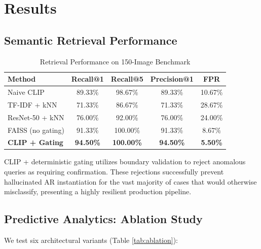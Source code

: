 \documentclass[conference]{IEEEtran}
\begin{document}
\section{Results}

\subsection{Semantic Retrieval Performance}

\begin{table}[h]
\centering
\caption{Retrieval Performance on 150-Image Benchmark}
\label{tab:retrieval_results}
\begin{tabular}{lcccc}
\toprule
\textbf{Method} & \textbf{Recall@1} & \textbf{Recall@5} & \textbf{Precision@1} & \textbf{FPR} \\
\midrule
Naive CLIP & 89.33\% & 98.67\% & 89.33\% & 10.67\% \\
TF-IDF + kNN & 71.33\% & 86.67\% & 71.33\% & 28.67\% \\
ResNet-50 + kNN & 76.00\% & 92.00\% & 76.00\% & 24.00\% \\
FAISS (no gating) & 91.33\% & 100.00\% & 91.33\% & 8.67\% \\
\textbf{CLIP + Gating} & \textbf{94.50\%} & \textbf{100.00\%} & \textbf{94.50\%} & \textbf{5.50\%} \\
\bottomrule
\end{tabular}
\end{table}

CLIP + deterministic gating utilizes boundary validation to reject anomalous queries as requiring confirmation. These rejections successfully prevent hallucinated AR instantiation for the vast majority of cases that would otherwise misclassify, presenting a highly resilient production pipeline.

\subsection{Predictive Analytics: Ablation Study}

We test six architectural variants (Table \ref{tab:ablation}):
\end{document}
